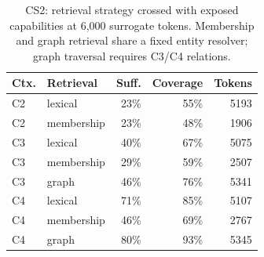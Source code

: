\begin{table}[t]
\centering\footnotesize
\setlength{\tabcolsep}{3pt}
\caption{CS2: retrieval strategy crossed with exposed capabilities at 6,000 surrogate tokens. Membership and graph retrieval share a fixed entity resolver; graph traversal requires C3/C4 relations.}
\label{tab:cs2}
\begin{tabular}{@{}llrrr@{}}
\toprule
Ctx. & Retrieval & Suff. & Coverage & Tokens \\
\midrule
C2 & lexical & 23\% & 55\% & 5193 \\
C2 & membership & 23\% & 48\% & 1906 \\
C3 & lexical & 40\% & 67\% & 5075 \\
C3 & membership & 29\% & 59\% & 2507 \\
C3 & graph & 46\% & 76\% & 5341 \\
C4 & lexical & 71\% & 85\% & 5107 \\
C4 & membership & 46\% & 69\% & 2767 \\
C4 & graph & 80\% & 93\% & 5345 \\
\bottomrule
\end{tabular}
\end{table}
